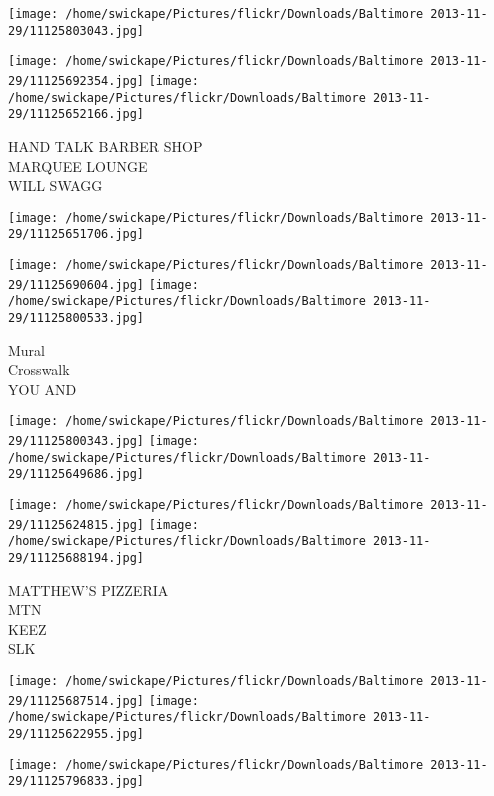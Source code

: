 \documentclass[10pt,letterpaper]{article}
\begin{document}
\texttt{[image: /home/swickape/Pictures/flickr/Downloads/Baltimore 2013-11-29/11125803043.jpg]}

\vspace{0.25in}
\texttt{[image: /home/swickape/Pictures/flickr/Downloads/Baltimore 2013-11-29/11125692354.jpg]}
\texttt{[image: /home/swickape/Pictures/flickr/Downloads/Baltimore 2013-11-29/11125652166.jpg]}

HAND TALK BARBER SHOP\\
MARQUEE LOUNGE\\
WILL SWAGG\\
\pagebreak

\texttt{[image: /home/swickape/Pictures/flickr/Downloads/Baltimore 2013-11-29/11125651706.jpg]}

\vspace{0.25in}
\texttt{[image: /home/swickape/Pictures/flickr/Downloads/Baltimore 2013-11-29/11125690604.jpg]}
\texttt{[image: /home/swickape/Pictures/flickr/Downloads/Baltimore 2013-11-29/11125800533.jpg]}

Mural\\
Crosswalk\\
YOU AND\\
\pagebreak

\texttt{[image: /home/swickape/Pictures/flickr/Downloads/Baltimore 2013-11-29/11125800343.jpg]}
\texttt{[image: /home/swickape/Pictures/flickr/Downloads/Baltimore 2013-11-29/11125649686.jpg]}

\texttt{[image: /home/swickape/Pictures/flickr/Downloads/Baltimore 2013-11-29/11125624815.jpg]}
\texttt{[image: /home/swickape/Pictures/flickr/Downloads/Baltimore 2013-11-29/11125688194.jpg]}

MATTHEW'S PIZZERIA\\
MTN\\
KEEZ\\
SLK\\
\pagebreak

\texttt{[image: /home/swickape/Pictures/flickr/Downloads/Baltimore 2013-11-29/11125687514.jpg]}
\texttt{[image: /home/swickape/Pictures/flickr/Downloads/Baltimore 2013-11-29/11125622955.jpg]}

\vspace{0.25in}
\texttt{[image: /home/swickape/Pictures/flickr/Downloads/Baltimore 2013-11-29/11125796833.jpg]}
\end{document}
